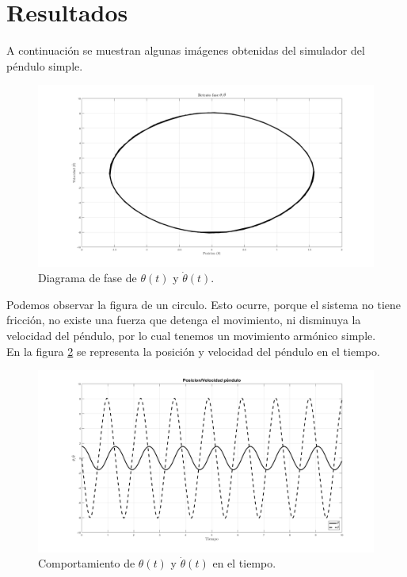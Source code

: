 \section{Resultados}
A continuación se muestran algunas imágenes obtenidas del simulador del péndulo simple.


\begin{figure}[hb]
 \centering 
 \includegraphics[scale=0.35]{./img/faseNF.png}
\caption{Diagrama de fase de $\theta(t)$ y $\dot{\theta}(t)$.}
 \label{fig: phase plot - NF}
\end{figure}

Podemos observar la figura de un circulo. Esto ocurre, porque el sistema no tiene fricción, no existe una fuerza que detenga el movimiento, ni disminuya la velocidad del péndulo, por lo cual tenemos un movimiento armónico simple.\\

En la figura \ref{fig: time plot - NF} se representa la posición y velocidad del péndulo en el tiempo.

\begin{figure}[hb]
 \centering 
 \includegraphics[scale=0.35]{./img/PosVelNF.png}
 \caption{Comportamiento de $\theta(t)$ y $\dot{\theta}(t)$ en el tiempo.}
 \label{fig: time plot - NF}
\end{figure}

